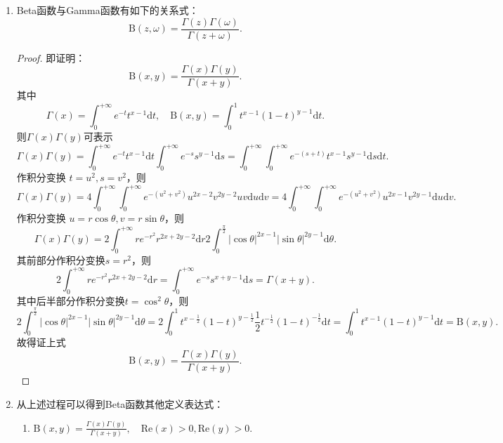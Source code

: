 \begin{property}
\begin{enumerate}[noitemsep]
\begin{enumerate}[noitemsep]
			\item $\displaystyle \mathrm{B}\left(x,y+1\right) = \mathrm{B}\left(x,y\right)\cdot \frac{y}{x+y}.$
		\end{enumerate}
		\begin{proof}
			直接利用上述性质，便可以证明(2)和(3)式，(2)和(3)式相加，可以证明(1)式。
		\end{proof}
		\item Beta函数与Gamma函数有如下的关系式：
		\begin{equation}
		\mathrm{B}\left(z,\omega\right) = \frac{\Gamma\left(z\right) \Gamma\left(\omega\right)}{\Gamma\left(z+\omega\right)}.
		\end{equation}
		\begin{proof}
			即证明：
			$$\mathrm{B}\left(x,y\right)=\frac{\Gamma\left(x\right)\Gamma\left(y\right)}{\Gamma\left(x+y\right)}.$$
			其中 $$\Gamma\left(x\right)=\int_0^{+\infty} e^{-t} t^{x-1} \mathrm{d}t,\quad \mathrm{B} \left(x,y\right)=\int_0^1 t^{x-1}\left(1-t\right)^{y-1} \mathrm{d}t.$$
			则$\Gamma\left(x\right) \Gamma\left(y\right)$可表示
			$$\Gamma\left(x\right) \Gamma\left(y\right)  = \int_0^{+\infty} e^{-t} t^{x-1} \mathrm{d}t \int_0^{+\infty} e^{-s} s^{y-1} \mathrm{d}s = \int_0^{+\infty} \int_0^{+\infty} e^{-\left(s+t\right)} t^{x-1} s^{y-1} \mathrm{d}s \mathrm{d}t.$$
			作积分变换 $t=u^2,s=v^2$，则
			$$
			\Gamma\left(x\right) \Gamma\left(y\right) = 4 \int_0^{+\infty} \int_0^{+\infty} e^{-\left(u^2+v^2\right)} u^{2x-2} v^{2y-2} uv \mathrm{d}u \mathrm{d}v = 4 \int_0^{+\infty} \int_0^{+\infty} e^{-\left(u^2+v^2\right)} u^{2x-1} v^{2y-1} \mathrm{d}u  \mathrm{d}v.
			$$			
			作积分变换 $u=r\cos \theta,v=r\sin \theta$，则
			$$
			\Gamma\left(x\right) \Gamma\left(y\right) = 2 \int_0^{+\infty} r e^{-r^2} r^{2x+2y-2} \mathrm{d}r 2\int_0^{\frac{\pi}{2}} |\cos \theta|^{2x-1} |\sin \theta|^{2y-1} \mathrm{d} \theta.
			$$
			其前部分作积分变换$s = r^2$，则
			$$ 2 \int_0^{+\infty} r e^{-r^2} r^{2x+2y-2} \mathrm{d}r = \int_0^{+\infty} e^{-s} s^{x+y-1} \mathrm{d}s =  \Gamma\left(x+y\right).$$
			其中后半部分作积分变换$t=\cos^2 \theta$，则
			$$2 \int_0^{\frac{\pi}{2}} |\cos \theta|^{2x-1} |\sin \theta|^{2y-1} \mathrm{d} \theta = 2 \int_0^{1} t^{x-\frac{1}{2}} \left(1-t\right)^{y-\frac{1}{2}} \frac{1}{2} t^{-\frac{1}{2}}  \left(1-t\right)^{-\frac{1}{2}} \mathrm{d}t = \int_0^1 t^{x-1} \left(1-t\right)^{y-1} \mathrm{d}t = \mathrm{B} \left(x,y\right).
			$$
			故得证上式
			$$\mathrm{B}\left(x,y\right)=\frac{\Gamma\left(x\right)\Gamma\left(y\right)}{\Gamma\left(x+y\right)}. $$
		\end{proof}
		\item 从上述过程可以得到Beta函数其他定义表达式：
		\begin{enumerate}[noitemsep]
		\item $	\displaystyle {\mathrm{B}\left(x,y\right)}= \frac{\Gamma\left(x\right)\Gamma\left(y\right)}{\Gamma\left(x+y\right)},\quad \mathrm{Re}\left(x\right)>0,\mathrm{Re}\left(y\right)>0	.$
		

\end{enumerate}
\end{enumerate}
\end{property}
